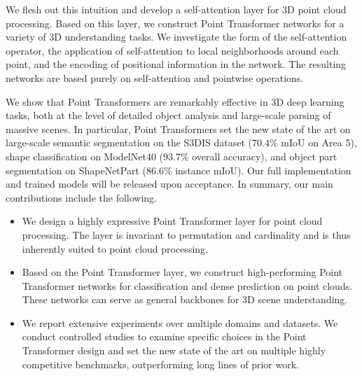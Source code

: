 We flesh out this intuition and develop a self-attention layer for 3D point cloud processing. Based on this layer, we construct Point Transformer networks for a variety of 3D understanding tasks. We investigate the form of the self-attention operator, the application of self-attention to local neighborhoods around each point, and the encoding of positional information in the network. The resulting networks are based purely on self-attention and pointwise operations.

We show that Point Transformers are remarkably effective in 3D deep learning tasks, both at the level of detailed object analysis and large-scale parsing of massive scenes. In particular, Point Transformers set the new state of the art on large-scale semantic segmentation on the S3DIS dataset (70.4\% mIoU on Area 5), shape classification on ModelNet40 (93.7\% overall accuracy), and object part segmentation on ShapeNetPart (86.6\% instance mIoU). Our full implementation and trained models will be released upon acceptance. In summary, our main contributions include the following.
\begin{itemize}[itemsep=0mm, topsep=2mm]
	\item
	We design a highly expressive Point Transformer layer for point cloud processing. The layer is invariant to permutation and cardinality and is thus inherently suited to point cloud processing.
	\item
	Based on the Point Transformer layer, we construct high-performing Point Transformer networks for classification and dense prediction on point clouds. These networks can serve as general backbones for 3D scene understanding.
	\item
	We report extensive experiments over multiple domains and datasets. We conduct controlled studies to examine specific choices in the Point Transformer design and set the new state of the art on multiple highly competitive benchmarks, outperforming long lines of prior work.
\end{itemize}
